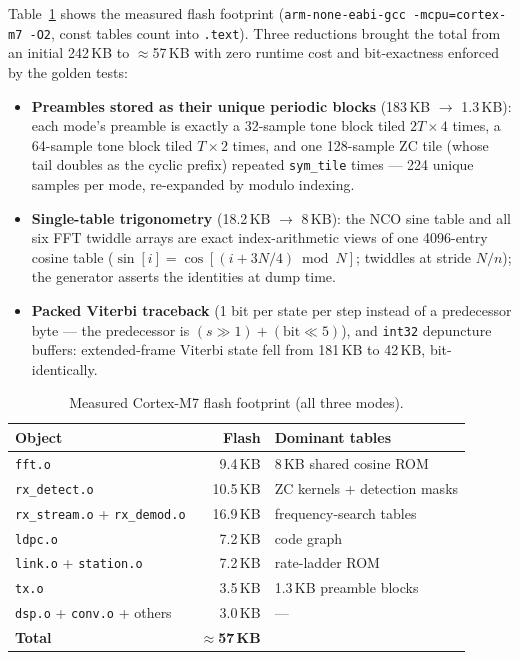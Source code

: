 Table~\ref{tab:cport_flash} shows the measured flash footprint
(\texttt{arm-none-eabi-gcc -mcpu=cortex-m7 -O2}, const tables count
into \texttt{.text}).  Three reductions brought the total from an
initial 242\,KB to $\approx$57\,KB with zero runtime cost and
bit-exactness enforced by the golden tests:

\begin{itemize}
    \item \textbf{Preambles stored as their unique periodic blocks}
          (183\,KB $\rightarrow$ 1.3\,KB): each mode's preamble is
          exactly a 32-sample tone block tiled $2T{\times}4$ times, a
          64-sample tone block tiled $T{\times}2$ times, and one
          128-sample ZC tile (whose tail doubles as the cyclic prefix)
          repeated \texttt{sym\_tile} times --- 224 unique samples per
          mode, re-expanded by modulo indexing.
    \item \textbf{Single-table trigonometry} (18.2\,KB $\rightarrow$
          8\,KB): the NCO sine table and all six FFT twiddle arrays are
          exact index-arithmetic views of one 4096-entry cosine table
          ($\sin[i]=\cos[(i+3N/4) \bmod N]$; twiddles at stride
          $N/n$); the generator asserts the identities at dump time.
    \item \textbf{Packed Viterbi traceback} (1 bit per state per step
          instead of a predecessor byte --- the predecessor is
          $(s{\gg}1) + (\mathrm{bit}{\ll}5)$), and \texttt{int32}
          depuncture buffers: extended-frame Viterbi state fell from
          181\,KB to 42\,KB, bit-identically.
\end{itemize}

\begin{table}[H]
    \centering
    \caption{Measured Cortex-M7 flash footprint (all three modes).}
    \label{tab:cport_flash}
    \small
    \begin{tabular}{@{}lrl@{}}
    \toprule
    \textbf{Object} & \textbf{Flash} & \textbf{Dominant tables} \\
    \midrule
    \texttt{fft.o}        & 9.4\,KB  & 8\,KB shared cosine ROM \\
    \texttt{rx\_detect.o} & 10.5\,KB & ZC kernels + detection masks \\
    \texttt{rx\_stream.o} + \texttt{rx\_demod.o} & 16.9\,KB &
                            frequency-search tables \\
    \texttt{ldpc.o}       & 7.2\,KB  & code graph \\
    \texttt{link.o} + \texttt{station.o} & 7.2\,KB & rate-ladder ROM \\
    \texttt{tx.o}         & 3.5\,KB  & 1.3\,KB preamble blocks \\
    \texttt{dsp.o} + \texttt{conv.o} + others & 3.0\,KB & --- \\
    \midrule
    \textbf{Total}        & \textbf{$\approx$57\,KB} & \\
    \bottomrule
    \end{tabular}
\end{table}

